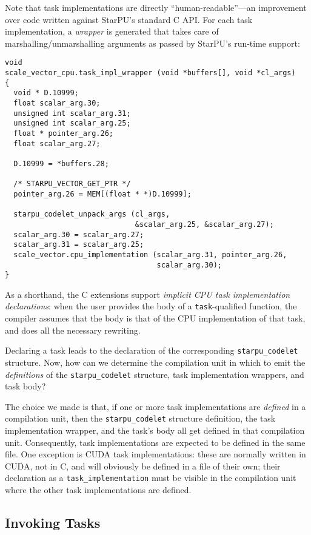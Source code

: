\documentclass[twoside, a4paper, 10pt]{article}
\begin{document}
Note that task implementations are directly ``human-readable''---an
improvement over code written against StarPU's standard C API.  For each
task implementation, a \emph{wrapper} is generated that takes care of
marshalling/unmarshalling arguments as passed by StarPU's run-time
support:


\begin{verbatim}
void
scale_vector_cpu.task_impl_wrapper (void *buffers[], void *cl_args)
{
  void * D.10999;
  float scalar_arg.30;
  unsigned int scalar_arg.31;
  unsigned int scalar_arg.25;
  float * pointer_arg.26;
  float scalar_arg.27;

  D.10999 = *buffers.28;

  /* STARPU_VECTOR_GET_PTR */
  pointer_arg.26 = MEM[(float * *)D.10999];

  starpu_codelet_unpack_args (cl_args,
                              &scalar_arg.25, &scalar_arg.27);
  scalar_arg.30 = scalar_arg.27;
  scalar_arg.31 = scalar_arg.25;
  scale_vector.cpu_implementation (scalar_arg.31, pointer_arg.26,
                                   scalar_arg.30);
}
\end{verbatim}

As a shorthand, the C extensions support \emph{implicit CPU task implementation declarations}: when the user provides the body of a
\texttt{task}-qualified function, the compiler assumes that the body is that of
the CPU implementation of that task, and does all the necessary
rewriting.

Declaring a task leads to the declaration of the corresponding
\texttt{starpu\_codelet} structure.  Now, how can we determine the compilation
unit in which to emit the \emph{definitions} of the \texttt{starpu\_codelet}
structure, task implementation wrappers, and task body?

The choice we made is that, if one or more task implementations are
\emph{defined} in a compilation unit, then the \texttt{starpu\_codelet} structure
definition, the task implementation wrapper, and the task's body all get
defined in that compilation unit.  Consequently, task implementations
are expected to be defined in the same file.  One exception is CUDA task
implementations: these are normally written in CUDA, not in C, and will
obviously be defined in a file of their own; their declaration as a
\texttt{task\_implementation} must be visible in the compilation unit where the
other task implementations are defined.
\subsection{Invoking Tasks}
\label{sec-3-3}
\end{document}
